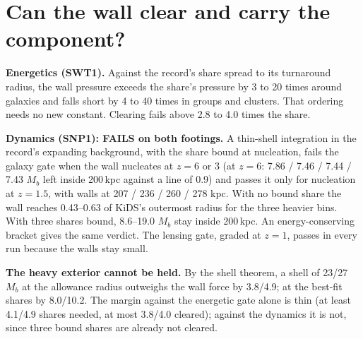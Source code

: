 \documentclass[10pt]{article}
\begin{document}
\section{Can the wall clear and carry the component?}
\textbf{Energetics (SWT1).} Against the record's share spread to its turnaround radius, the wall pressure exceeds the share's pressure by 3 to 20 times around galaxies and falls short by 4 to 40 times in groups and clusters. That ordering needs no new constant. Clearing fails above 2.8 to 4.0 times the share.

\textbf{Dynamics (SNP1): FAILS on both footings.} A thin-shell integration in the record's expanding background, with the share bound at nucleation, fails the galaxy gate when the wall nucleates at $z=6$ or 3 (at $z=6$: 7.86 / 7.46 / 7.44 / 7.43 $M_b$ left inside 200\,kpc against a line of 0.9) and passes it only for nucleation at $z=1.5$, with walls at 207 / 236 / 260 / 278 kpc. With no bound share the wall reaches 0.43--0.63 of KiDS's outermost radius for the three heavier bins. With three shares bound, 8.6--19.0 $M_b$ stay inside 200\,kpc. An energy-conserving bracket gives the same verdict. The lensing gate, graded at $z=1$, passes in every run because the walls stay small.

\textbf{The heavy exterior cannot be held.} By the shell theorem, a shell of 23/27\,$M_b$ at the allowance radius outweighs the wall force by 3.8/4.9; at the best-fit shares by 8.0/10.2. The margin against the energetic gate alone is thin (at least 4.1/4.9 shares needed, at most 3.8/4.0 cleared); against the dynamics it is not, since three bound shares are already not cleared.
\end{document}
